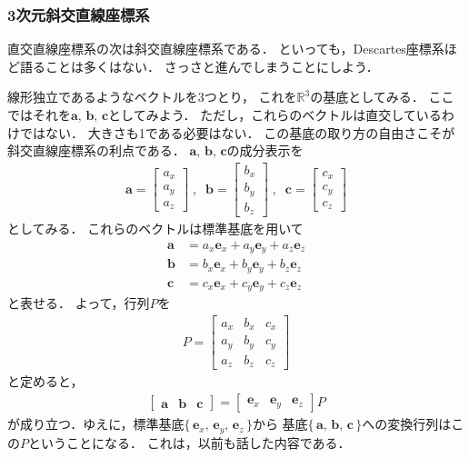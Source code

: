 \subsubsection{3次元斜交直線座標系}
直交直線座標系の次は斜交直線座標系である．
といっても，Descartes座標系ほど語ることは多くはない．
さっさと進んでしまうことにしよう．

線形独立であるようなベクトルを3つとり，
これを$\mathbb{R}^3$の基底としてみる．
ここではそれを$\bm{a}, \, \bm{b}, \, \bm{c}$としてみよう．
ただし，これらのベクトルは直交しているわけではない．
大きさも1である必要はない．
この基底の取り方の自由さこそが斜交直線座標系の利点である．
$\bm{a}, \, \bm{b}, \, \bm{c}$の成分表示を
\begin{align*}
\bm{a} = \left[
\begin{array}{c}
a_x \\
a_y \\
a_z
\end{array}
\right]
\; , \;  \;
\bm{b} = \left[
\begin{array}{c}
b_x \\
b_y \\
b_z
\end{array}
\right]
\; , \;  \;
\bm{c} = \left[
\begin{array}{c}
c_x \\
c_y \\
c_z
\end{array}
\right]
\end{align*}
としてみる．
これらのベクトルは標準基底を用いて
\begin{align*}
\bm{a} & = a_x \bm{e}_x + a_y \bm{e}_y + a_z \bm{e}_z \\
\bm{b} & = b_x \bm{e}_x + b_y \bm{e}_y + b_z \bm{e}_z \\
\bm{c} & = c_x \bm{e}_x + c_y \bm{e}_y + c_z \bm{e}_z 
\end{align*}
と表せる．
よって，行列$P$を
\begin{align*}
P = \left[
\begin{array}{ccc}
a_x & b_x & c_x \\
a_y & b_y & c_y \\
a_z & b_z & c_z 
\end{array}
\right]
\end{align*}
と定めると，
\begin{align*}
\left[
\begin{array}{ccc}
\bm{a} & \bm{b} & \bm{c} 
\end{array}
\right]
= 
\left[
\begin{array}{ccc}
\bm{e}_x & \bm{e}_y & \bm{e}_z 
\end{array}
\right] P
\end{align*}
が成り立つ．ゆえに，標準基底$\{ \, \bm{e}_x , \, \bm{e}_y , \, \bm{e}_z \, \}$から
基底$\{ \, \bm{a} , \, \bm{b} , \, \bm{c} \, \}$への変換行列はこの$P$ということになる．
これは，以前も話した内容である．
